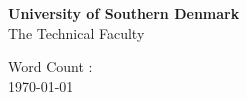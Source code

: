 \begin{titlepage}
\begin{center}
        \vfill
        
        \textbf{University of Southern Denmark}\\  
        The Technical Faculty\\
        
        \vspace{0.5cm}
        
        Word Count :  \\
        \today
            
   \end{center}
\end{titlepage}